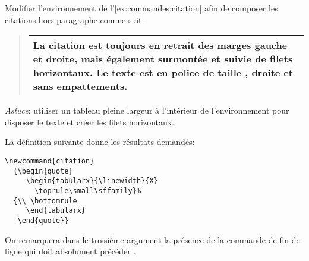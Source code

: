 \begin{exercice}
  Modifier l'environnement  de
  l'\autoref{ex:commandes:citation} afin de composer les citations
  hors paragraphe comme suit:
  \begin{quote}
    \begin{tabularx}{\linewidth}{X}
      \toprule
      \small\sffamily%
      La citation est toujours en retrait des marges gauche et droite,
      mais également surmontée et suivie de filets horizontaux. Le
      texte est en police de taille \cmdprint{\small}, droite et sans
      empattements. \\
      \bottomrule
    \end{tabularx}
  \end{quote}
  \emph{Astuce}: utiliser un tableau pleine largeur à l'intérieur de
  l'environnement  pour disposer le texte et créer les
  filets horizontaux.
  \begin{sol}
    La définition suivante donne les résultats demandés:
\begin{lstlisting}
\newcommand{citation}
  {\begin{quote}
     \begin{tabularx}{\linewidth}{X}
       \toprule\small\sffamily}%
  {\\ \bottomrule
     \end{tabularx}
   \end{quote}}
\end{lstlisting}
    On remarquera dans le troisième argument la présence de la
    commande de fin de ligne {\bs\bs} qui doit absolument précéder
    \cmdprint{\bottomrule}.
  \end{sol}
\end{exercice}


